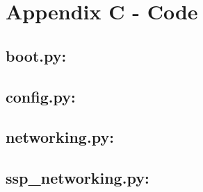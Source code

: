 \cleardoublepage%
\chapter*{\label{chap:apx_c}Appendix C - Code}%
%

\section*{boot.py:}
%
\section*{config.py:}

\section*{networking.py:}

\section*{ssp\_networking.py:}
